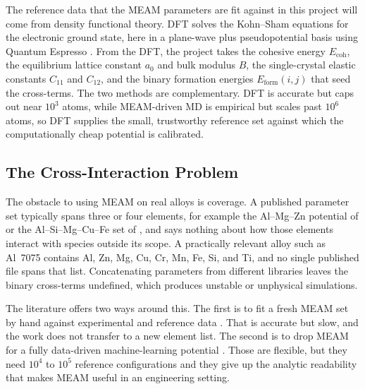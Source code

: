 The reference data that the MEAM parameters are fit against in this project will come from density
functional theory. DFT solves the Kohn--Sham equations \citep{kohn1965} for the
electronic ground state, here in a plane-wave plus pseudopotential basis using
Quantum Espresso \citep{giannozzi2009}. From the DFT, the project takes the cohesive
energy $E_\mathrm{coh}$, the equilibrium lattice constant $a_0$ and bulk
modulus $B$, the single-crystal elastic constants $C_{11}$ and $C_{12}$, and
the binary formation energies $E_\mathrm{form}(i,j)$ that seed the cross-terms.
The two methods are complementary. DFT is accurate but caps out near $10^3$
atoms, while MEAM-driven MD is empirical but scales past $10^6$ atoms, so DFT
supplies the small, trustworthy reference set against which the computationally cheap potential
is calibrated.

\subsection{The Cross-Interaction Problem}
The obstacle to using MEAM on real alloys is coverage. A published parameter
set typically spans three or four elements, for example the Al--Mg--Zn
potential of \citet{Dickel_2018} or the Al--Si--Mg--Cu--Fe set of
\citet{jelinek2012}, and says nothing about how those elements interact with
species outside its scope. A practically relevant alloy such as Al~7075
contains Al, Zn, Mg, Cu, Cr, Mn, Fe, Si, and Ti, and no single published
file spans that list. Concatenating parameters from different libraries
leaves the binary cross-terms undefined, which produces unstable or
unphysical simulations.

The literature offers two ways around this. The first is to fit a fresh MEAM
set by hand against experimental and reference data \citep{jelinek2012}. That
is accurate but slow, and the work does not transfer to a new element list.
The second is to drop MEAM for a fully data-driven machine-learning potential
\citep{behler2007,shapeev2016,mishin2021}. Those are flexible, but they need
$10^{4}$ to $10^{5}$ reference configurations and they give up the analytic
readability that makes MEAM useful in an engineering setting.

